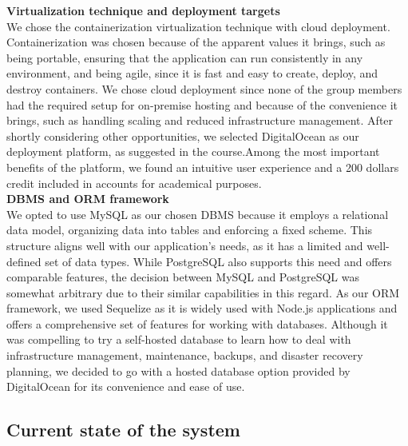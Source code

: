 
\textbf{Virtualization technique and deployment targets}\\
We chose the containerization virtualization technique with cloud deployment. Containerization was chosen because of the apparent values it brings, such as being portable, ensuring that the application can run consistently in any environment, and being agile, since it is fast and easy to create, deploy, and destroy containers. We chose cloud deployment since none of the group members had the required setup for on-premise hosting and because of the convenience it brings, such as handling scaling and reduced infrastructure management. After shortly considering other opportunities, we selected DigitalOcean as our deployment platform, as suggested in the course.Among the most important benefits of the platform, we found an intuitive user experience and a 200 dollars credit included in accounts for academical purposes.
\\


\textbf{DBMS and ORM framework}\\
We opted to use MySQL as our chosen DBMS because it employs a relational data model, organizing data into tables and enforcing a fixed scheme. This structure aligns well with our application's needs, as it has a limited and well-defined set of data types. While PostgreSQL also supports this need and offers comparable features, the decision between MySQL and PostgreSQL was somewhat arbitrary due to their similar capabilities in this regard. As our ORM framework, we used Sequelize as it is widely used with Node.js applications and offers a comprehensive set of features for working with databases. Although it was compelling to try a self-hosted database to learn how to deal with infrastructure management, maintenance, backups, and disaster recovery planning, we decided to go with a hosted database option provided by DigitalOcean for its convenience and ease of use.

\subsection{Current state of the system}

